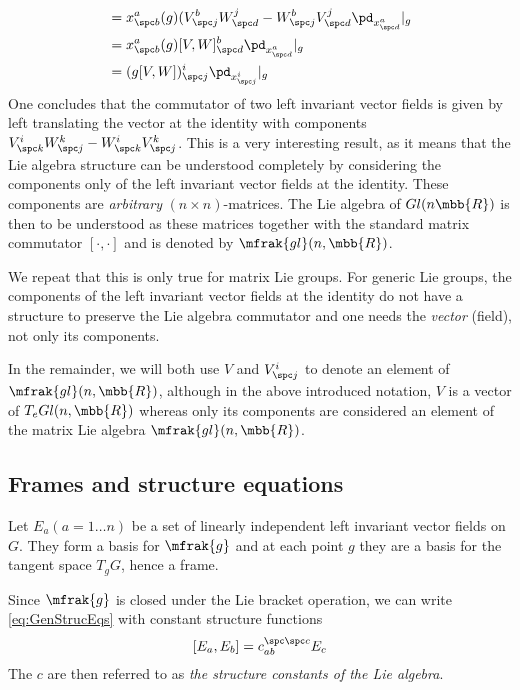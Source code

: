 \documentclass[10pt,reqno]{amsart}
\numberwithin{equation}{section}
\begin{document}
\begin{example}
\begin{displaymath}
\begin{split}
	&= x^a_{\spc b}(g) (V^b_{\spc j} W^j_{\spc d} - W^b_{\spc j} 
	V^j_{\spc d} \pd_{x^a_{\spc d}}|_g \\
	&= x^a_{\spc b}(g) [V,W]^b_{\spc d} \pd_{x^a_{\spc d}}|_g \\
	&= (g[V,W])^i_{\spc j} \pd_{x^i_{\spc j}}|_g
			\end{split}
	\end{displaymath}
	One concludes that the commutator of two left invariant vector 
	fields is given by left translating the vector at the identity 
	with components $V^i_{\spc k}W^k_{\spc j} - W^i_{\spc 
		k}V^k_{\spc j}$.
	This is a very interesting result, as it means that the Lie 
	algebra structure can be understood completely by considering 
	the components only of the left invariant vector fields at the 
	identity. These components are \emph{arbitrary} $(n \times 
	n)$-matrices. The Lie algebra of $Gl(n\mbb{R})$ is then to be 
	understood as these matrices together with the standard matrix 
	commutator $[\cdot,\cdot]$ and is denoted by 
	$\mfrak{gl}(n,\mbb{R})$.
  
	We repeat that this is only true for matrix Lie groups. For 
	generic Lie groups, the components of the left invariant vector 
	fields at the identity do not have a structure to preserve the 
	Lie algebra commutator and one needs the \emph{vector} (field), 
	not only its components.

	In the remainder, we will both use $V$ and $V^i_{\spc j}$ to 
	denote an element of $\mfrak{gl}(n,\mbb{R})$, although in the 
	above introduced notation, $V$ is a vector of $T_e 
	Gl(n,\mbb{R})$ whereas only its components are considered an 
	element of the matrix Lie algebra $\mfrak{gl}(n,\mbb{R})$.
\end{example}



\subsection{Frames and structure equations}

Let $E_a (a = 1\ldots n)$ be a set of linearly independent left 
invariant vector fields on $G$. They form a basis for $\mfrak{g}$ 
and at each point $g$ they are a basis for the tangent space $T_g 
G$, hence a frame.
    
Since $\mfrak{g}$ is closed under the Lie bracket operation, we 
can write \eqref{eq:GenStrucEqs} with constant structure 
functions
%
\begin{equation}\label{eq:LAStructEqs}
	[E_a,E_b] = c_{ab}^{\spc\spc c}E_c
\end{equation}
%
The $c$ are then referred to as \emph{the structure constants of 
	the Lie algebra}.
\end{document}
